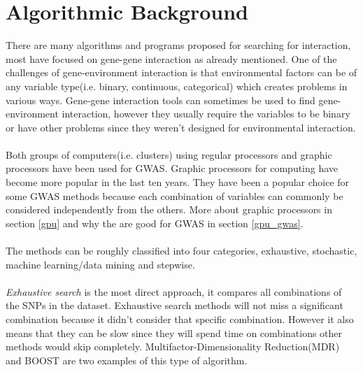 \documentclass[10pt,a4paper]{report}
\begin{document}





\section{Algorithmic Background}
\label{algorithm_background}
There are many algorithms and programs proposed for searching for interaction, most have focused on gene-gene interaction as already mentioned\cite{gene_enviroment_2013}. One of the challenges of gene-environment interaction is that environmental factors can be of any variable type(i.e. binary, continuous, categorical) which creates problems in various ways\cite{gene_enviroment_2013}. Gene-gene interaction tools can sometimes be used to find gene-environment interaction, however they usually require the variables to be binary or have other problems since they weren't designed for environmental interaction\cite{gene_enviroment_2013}.\\
\\
Both groups of computers(i.e. clusters) using regular processors\cite{biforce} and graphic processors\cite{gwis,gboost,gmdr_gpu,cuda_lr,genie_2012,plink_gpu} have been used for GWAS. Graphic processors for computing have become more popular in the last ten years. They have been a popular choice for some GWAS methods because each combination of variables can commonly be considered independently from the others. More about graphic processors in section \ref{gpu} and why the are good for GWAS in section \ref{gpu_gwas}.\\
\\
The methods can be roughly classified into four categories, exhaustive, stochastic, machine learning/data mining and stepwise\cite{fast_high_order_cluster}.\\
\\
\emph{Exhaustive search} is the most direct approach, it compares all combinations of the SNPs in the dataset. Exhaustive search methods will not miss a significant combination because it didn't consider that specific combination. However it also means that they can be slow since they will spend time on combinations other methods would skip completely. Multifactor-Dimensionality Reduction(MDR)\cite{mdr_2001} and BOOST\cite{boost_gene_gene} are two examples of this type of algorithm.\\
\end{document}
